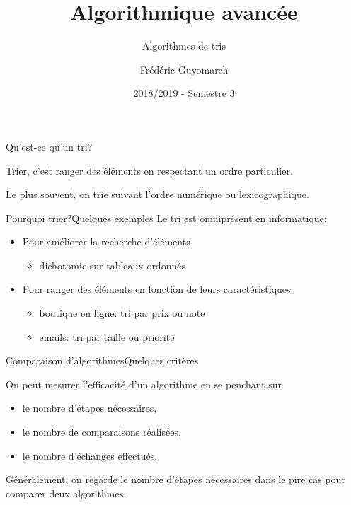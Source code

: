 \documentclass[12pt,a4paper]{beamer}
\title{\textbf{Algorithmique avancée}}
\subtitle{Algorithmes de tris}
\author{Frédéric Guyomarch}
\date{2018/2019 - Semestre 3}
\institute %
{

  IUT-A \\
  Université de Lille, Sciences et Technologies

}
\newcommand{\hl}[1]{\textcolor{blueemph}{#1}}
\begin{document}

\begin{frame}
\titlepage
\end{frame}


\begin{frame}{Qu'est-ce qu'un tri?}

\begin{definition}
Trier, c'est ranger des éléments en respectant un ordre particulier.
\end{definition}
\pause
\begin{center}
Le plus souvent, on trie suivant l'ordre numérique ou lexicographique.
\end{center}

\end{frame}


\begin{frame}{Pourquoi trier?}{Quelques exemples}
Le tri est omniprésent en informatique:
\begin{itemize}
\item Pour améliorer la recherche d'éléments 
  \begin{itemize}
  \item dichotomie sur tableaux ordonnés
  \end{itemize}
\item Pour ranger des éléments en fonction de leurs caractéristiques
  \begin{itemize}
  \item boutique en ligne: tri par prix ou note
  \item emails: tri par taille ou priorité
  \end{itemize}
\end{itemize}
\end{frame}

\begin{frame}{Comparaison d'algorithmes}{Quelques critères}

On peut mesurer l'efficacité d'un algorithme en se penchant sur
\begin{itemize}
\item le nombre d'\hl{étapes} nécessaires,
\item le nombre de \hl{comparaisons} réalisées,
\item le nombre d'\hl{échanges} effectués.
\end{itemize}

\pause
Généralement, on regarde le nombre d'étapes nécessaires dans le pire cas pour comparer deux algorithmes.

\end{frame}
\end{document}
